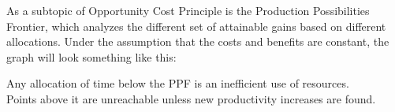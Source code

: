 \documentclass[nobib]{tufte-handout}
\begin{document}
As a subtopic of Opportunity Cost Principle is the Production Possibilities Frontier, which analyzes the different set of attainable gains based on different allocations. Under the assumption that the costs and benefits are constant, the graph will look something like this:
\begin{center}
\end{center}
Any allocation of time below the PPF is an inefficient use of resources.\\ Points above it are unreachable unless new productivity increases are found.
\end{document}
